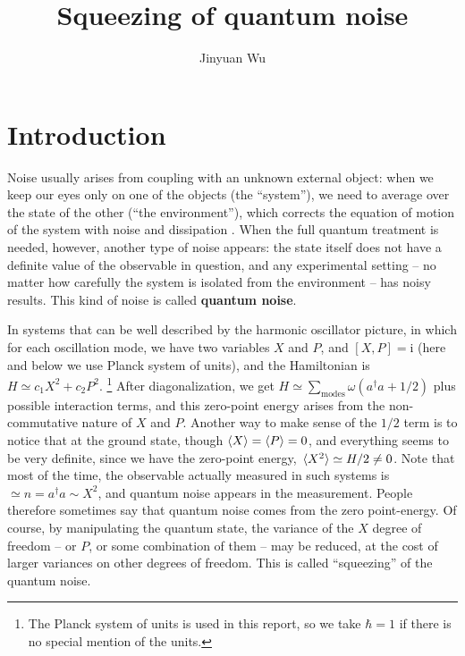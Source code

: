 \documentclass[hyperref, a4paper]{article}
\title{Squeezing of quantum noise}
\author{Jinyuan Wu}
\newcommand*{\ii}{\mathrm{i}}
\newcommand*{\concept}[1]{{\textbf{#1}}}
\begin{document}
    
\maketitle

\section{Introduction}

Noise usually arises from coupling with an unknown external object:
when we keep our eyes only on one of the objects (the ``system''),
we need to average over the state of the other (``the environment''),
which corrects the equation of motion of the system 
with noise and dissipation \cite{zwanzig_nonequilibrium_2001}.
When the full quantum treatment is needed,
however, another type of noise appears:
the state itself does not have a definite value of the observable in question, 
and any experimental setting 
-- no matter how carefully the system is isolated from the environment -- 
has noisy results.
This kind of noise is called \concept{quantum noise}.

In systems that can be well described by 
the harmonic oscillator picture,
in which for each oscillation mode, 
we have two variables $X$ and $P$, and $[X, P] = \ii$
(here and below we use Planck system of units),
and the Hamiltonian is $H \simeq c_1 X^2 + c_2 P^2$.%
\footnote{
    The Planck system of units is used in this report, 
    so we take $\hbar = 1$ if there is no special mention of the units.
}
After diagonalization, we get $H \simeq \sum_{\text{modes}} \omega (a^\dagger a + 1/2)$ 
plus possible interaction terms,
and this zero-point energy arises from the non-commutative nature of $X$ and $P$.
Another way to make sense of the $1/2$ term is to notice that at the ground state,
though $\expval{X} = \expval{P} = 0$,
and everything seems to be very definite,
since we have the zero-point energy,
$\expval*{X^2} \simeq H / 2 \neq 0$.
Note that most of the time, the observable actually measured in such systems 
is $\simeq n = a^\dagger a \sim X^2$,
and quantum noise appears in the measurement.
People therefore sometimes say that 
quantum noise comes from the zero point-energy.
Of course, by manipulating the quantum state, 
the variance of the $X$ degree of freedom -- or $P$, or some combination of them -- 
may be reduced,
at the cost of larger variances on other degrees of freedom.
This is called ``squeezing'' of the quantum noise.

\end{document}
